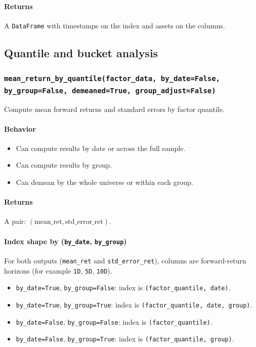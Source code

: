 \documentclass[11pt]{article}
\begin{document}
\paragraph{Returns}
A \texttt{DataFrame} with timestamps on the index and assets on the columns.

\subsection{Quantile and bucket analysis}

\subsubsection{\texttt{mean\_return\_by\_quantile(factor\_data, by\_date=False, by\_group=False, demeaned=True, group\_adjust=False)}}
Compute mean forward returns and standard errors by factor quantile.

\paragraph{Behavior}
\begin{itemize}
  \item Can compute results by date or across the full sample.
  \item Can compute results by group.
  \item Can demean by the whole universe or within each group.
\end{itemize}

\paragraph{Returns}
A pair: \((\text{mean\_ret}, \text{std\_error\_ret})\).

\paragraph{Index shape by (\texttt{by\_date}, \texttt{by\_group})}
For both outputs (\texttt{mean\_ret} and \texttt{std\_error\_ret}), columns are forward-return horizons (for example \texttt{1D}, \texttt{5D}, \texttt{10D}).

\begin{itemize}
  \item \texttt{by\_date=True}, \texttt{by\_group=False}: index is \texttt{(factor\_quantile, date)}.
  \item \texttt{by\_date=True}, \texttt{by\_group=True}: index is \texttt{(factor\_quantile, date, group)}.
  \item \texttt{by\_date=False}, \texttt{by\_group=False}: index is \texttt{(factor\_quantile)}.
  \item \texttt{by\_date=False}, \texttt{by\_group=True}: index is \texttt{(factor\_quantile, group)}.
\end{itemize}
\end{document}
